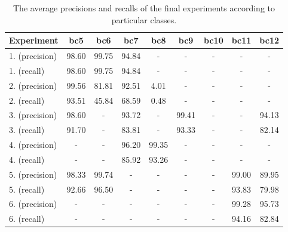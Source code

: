 \begin{table}[!htbp]
\centering
\begin{tabular}{|l|cccccccc|}
\hline
Experiment & bc5 & bc6 & bc7 & bc8 & bc9 & bc10 & bc11 & bc12 \\
\hline
1. (precision) & 98.60 & 99.75 & 94.84 & - & - & - & - & -\\
1. (recall) & 98.60 & 99.75 & 94.84 & - & - & - & - & -\\
2. (precision) & 99.56 & 81.81 & 92.51 & 4.01 & - & - & - & -\\
2. (recall) & 93.51 & 45.84 & 68.59 & 0.48 & - & - & - & -\\
3. (precision) &  98.60 & - & 93.72 & - & 99.41 & - & - & 94.13\\
3. (recall) &  91.70 & - & 83.81 & - & 93.33 & - & - & 82.14\\
4. (precision) &  - & - & 96.20 & 99.35 & - & - & - & -\\
4. (recall) &  - & - & 85.92 & 93.26 & - & - & - & -\\
5. (precision) & 98.33 & 99.74 & - & - & - & - & 99.00 & 89.95\\
5. (recall) & 92.66 & 96.50 & - & - & - & - & 93.83 & 79.98\\
6. (precision) & - & - & - & - & - & - & 99.28 & 95.73\\
6. (recall) & - & - & - & - & - & - & 94.16 & 82.84\\
\hline
\end{tabular}
\caption[Final tests precisions and recall]{The average precisions and recalls of the final experiments according to particular classes.}
\label{tab:final_test_classes}
\end{table}



